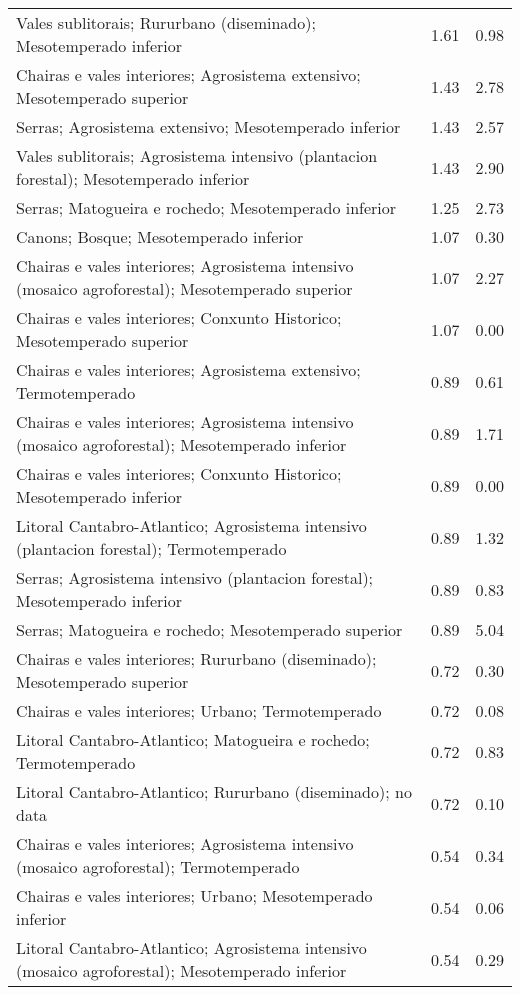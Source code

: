 \begin{table}[p]
\begin{tabular}{lrr}
  Vales sublitorais; Rururbano (diseminado); Mesotemperado inferior & 1.61 & 0.98 \\ 
  Chairas e vales interiores; Agrosistema extensivo; Mesotemperado superior & 1.43 & 2.78 \\ 
  Serras; Agrosistema extensivo; Mesotemperado inferior & 1.43 & 2.57 \\ 
  Vales sublitorais; Agrosistema intensivo (plantacion forestal); Mesotemperado inferior & 1.43 & 2.90 \\ 
  Serras; Matogueira e rochedo; Mesotemperado inferior & 1.25 & 2.73 \\ 
  Canons; Bosque; Mesotemperado inferior & 1.07 & 0.30 \\ 
  Chairas e vales interiores; Agrosistema intensivo (mosaico agroforestal); Mesotemperado superior & 1.07 & 2.27 \\ 
  Chairas e vales interiores; Conxunto Historico; Mesotemperado superior & 1.07 & 0.00 \\ 
  Chairas e vales interiores; Agrosistema extensivo; Termotemperado & 0.89 & 0.61 \\ 
  Chairas e vales interiores; Agrosistema intensivo (mosaico agroforestal); Mesotemperado inferior & 0.89 & 1.71 \\ 
  Chairas e vales interiores; Conxunto Historico; Mesotemperado inferior & 0.89 & 0.00 \\ 
  Litoral Cantabro-Atlantico; Agrosistema intensivo (plantacion forestal); Termotemperado & 0.89 & 1.32 \\ 
  Serras; Agrosistema intensivo (plantacion forestal); Mesotemperado inferior & 0.89 & 0.83 \\ 
  Serras; Matogueira e rochedo; Mesotemperado superior & 0.89 & 5.04 \\ 
  Chairas e vales interiores; Rururbano (diseminado); Mesotemperado superior & 0.72 & 0.30 \\ 
  Chairas e vales interiores; Urbano; Termotemperado & 0.72 & 0.08 \\ 
  Litoral Cantabro-Atlantico; Matogueira e rochedo; Termotemperado & 0.72 & 0.83 \\ 
  Litoral Cantabro-Atlantico; Rururbano (diseminado); no data & 0.72 & 0.10 \\ 
  Chairas e vales interiores; Agrosistema intensivo (mosaico agroforestal); Termotemperado & 0.54 & 0.34 \\ 
  Chairas e vales interiores; Urbano; Mesotemperado inferior & 0.54 & 0.06 \\ 
  Litoral Cantabro-Atlantico; Agrosistema intensivo (mosaico agroforestal); Mesotemperado inferior & 0.54 & 0.29 \\ 

\end{tabular}
\end{table}
